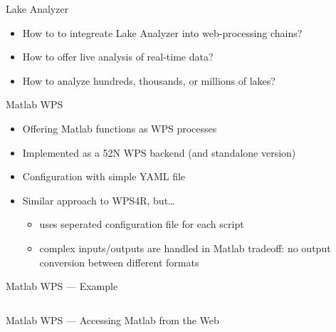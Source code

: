 \documentclass[xcolor=svgnames,professionalfonts,11pt,aspectratio=43]{beamer}
\begin{document}
\begin{frame}[c]{Lake Analyzer}
  \begin{itemize}
    \item How to to integreate Lake Analyzer into web-processing chains?
    \pause
    \item How to offer live analysis of real-time data?
    \pause
    \item How to analyze hundreds, thousands, or millions of lakes?
  \end{itemize}
\end{frame}


\begin{frame}[t]{Matlab WPS}
  \begin{itemize}
    \item Offering Matlab functions as WPS processes
    \item Implemented as a 52\textdegree{}N WPS backend (and standalone version)
    \item Configuration with simple YAML file
    \item Similar approach to WPS4R, but\dots
    \begin{itemize}
      \item uses seperated configuration file for each script
      \item complex inputs/outputs are handled in Matlab
      \pause
      \arrow tradeoff: no output conversion between different formats
    \end{itemize}
  \end{itemize}
\end{frame}

\begin{frame}[fragile]{Matlab WPS --- Example}
  \begin{columns}
    
    \pause
    
    \pause
    
  \end{columns}
\end{frame}

\begin{frame}[c,fragile]{Matlab WPS --- Accessing Matlab from the Web}
  \begin{columns}
    
    \pause
    
    \pause
    
  \end{columns}
\end{frame}
\end{document}
